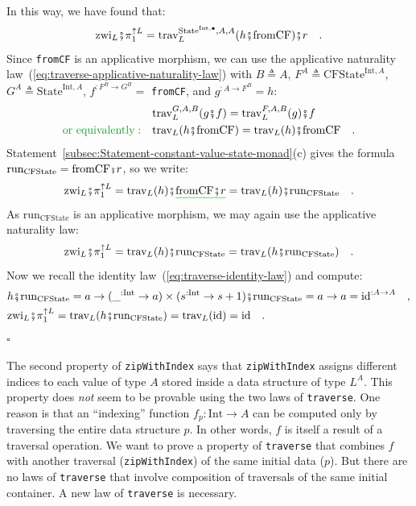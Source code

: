 In this way, we have found that:
\[
\text{zwi}_{L}\bef\pi_{1}^{\uparrow L}=\text{trav}_{L}^{\text{State}^{\text{Int},\bullet},A,A}(h\bef\text{fromCF})\bef r\quad.
\]
Since \lstinline!fromCF! is an applicative morphism, we can use the
applicative naturality law~(\ref{eq:traverse-applicative-naturality-law})
with $B\triangleq A$, $F^{A}\triangleq\text{CFState}^{\text{Int},A}$,
$G^{A}\triangleq\text{State}^{\text{Int},A}$, $f^{:F^{B}\rightarrow G^{B}}=$
\lstinline!fromCF!, and $g^{:A\rightarrow F^{B}}=h$:
\begin{align*}
 & \text{trav}_{L}^{G,A,B}(g\bef f)=\text{trav}_{L}^{F,A,B}(g)\bef f\\
{\color{greenunder}\text{or equivalently}:}\quad & \text{trav}_{L}(h\bef\text{fromCF})=\text{trav}_{L}(h)\bef\text{fromCF}\quad.
\end{align*}
Statement~\ref{subsec:Statement-constant-value-state-monad}(c) gives
the formula $\text{run}_{\text{CFState}}=\text{fromCF}\bef r$, so
we write:
\[
\text{zwi}_{L}\bef\pi_{1}^{\uparrow L}=\text{trav}_{L}(h)\bef\gunderline{\text{fromCF}\bef r}=\text{trav}_{L}(h)\bef\text{run}_{\text{CFState}}\quad.
\]
As $\text{run}_{\text{CFState}}$ is an applicative morphism, we may
again use the applicative naturality law:
\[
\text{zwi}_{L}\bef\pi_{1}^{\uparrow L}=\text{trav}_{L}(h)\bef\text{run}_{\text{CFState}}=\text{trav}_{L}(h\bef\text{run}_{\text{CFState}})\quad.
\]
Now we recall the identity law~(\ref{eq:traverse-identity-law})
and compute:
\begin{align*}
 & h\bef\text{run}_{\text{CFState}}=a\rightarrow(\_^{:\text{Int}}\rightarrow a)\times(s^{:\text{Int}}\rightarrow s+1)\bef\text{run}_{\text{CFState}}=a\rightarrow a=\text{id}^{:A\rightarrow A}\quad,\\
 & \text{zwi}_{L}\bef\pi_{1}^{\uparrow L}=\text{trav}_{L}(h\bef\text{run}_{\text{CFState}})=\text{trav}_{L}(\text{id})=\text{id}\quad.
\end{align*}
 $\square$

The second property of \lstinline!zipWithIndex! says that \lstinline!zipWithIndex!
assigns different indices to each value of type $A$ stored inside
a data structure of type $L^{A}$. This property does \emph{not} seem
to be provable using the two laws of \lstinline!traverse!. One reason
is that an \textsf{``}indexing\textsf{''} function $f_{p}:\text{Int}\rightarrow A$
can be computed only by traversing the entire data structure $p$.
In other words, $f$ is itself a result of a traversal operation.
We want to prove a property of \lstinline!traverse! that combines
$f$ with another traversal (\lstinline!zipWithIndex!) of the same
initial data ($p$). But there are no laws of \lstinline!traverse!
that involve composition of traversals of the same initial container.
A new law of \lstinline!traverse! is necessary. 

